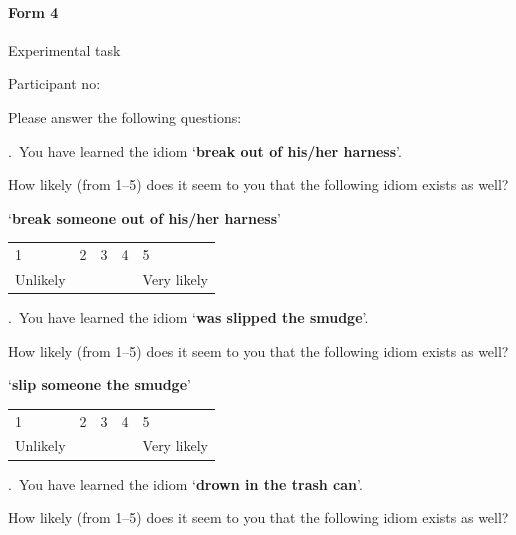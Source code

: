 \documentclass[output=paper]{langsci/langscibook}
\begin{document}
\begin{subappendices}
{\largerpage[2]
\paragraph*{Form 4} Experimental task

\noindent Participant no: \underline{\hphantom{3em}}

\noindent Please answer the following questions:\vspace{.5\baselineskip}

.\ You have learned the idiom \enquote*{\textbf{break out of his/her harness}}.

\noindent How likely (from 1--5) does it seem to you that the following idiom
exists as well?\vspace{.5\baselineskip}

\noindent \enquote*{\textbf{break someone out of his/her harness}}\vspace{.5\baselineskip}

\noindent \begin{tabularx}{\textwidth}{XXXXX}
    1 & 2 & 3 & 4 & 5\\
    Unlikely & & & & Very likely\\
\end{tabularx}\vspace{1\baselineskip}

.\ You have learned the idiom \enquote*{\textbf{was slipped the smudge}}.

\noindent How likely (from 1--5) does it seem to you that the following idiom exists
    as well?\vspace{.5\baselineskip}

\noindent \enquote*{\textbf{slip someone the smudge}}\vspace{.5\baselineskip}

\noindent \begin{tabularx}{\textwidth}{XXXXX}
        1 & 2 & 3 & 4 & 5\\
        Unlikely & & & & Very likely\\
        \end{tabularx}\vspace{1\baselineskip}

\newpage

.\ You have learned the idiom \enquote*{\textbf{drown in the trash can}}.

\noindent How likely (from 1--5) does it seem to you that the following idiom exists
    as well?\vspace{.5\baselineskip}

}
\end{subappendices}
\end{document}
